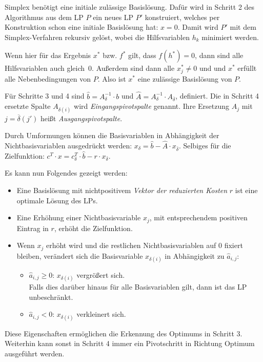 \documentclass{panikzettel}
\begin{document}
Simplex benötigt eine initiale zulässige Basislösung.
Dafür wird in Schritt 2 des Algorithmus aus dem LP $P$ ein neues LP $P'$ konstruiert, welches per Konstruktion schon eine initiale Basislösung hat: $x = 0$.
Damit wird $P'$ mit dem Simplex-Verfahren rekursiv gelöst, wobei die Hilfsvariablen $h_k$ minimiert werden.

Wenn hier für das Ergebnis $x^\ast$ bzw. $f^\ast$ gilt, dass $f(h^\ast) = 0$, dann sind alle Hilfsvariablen auch gleich~$0$.
Außerdem sind dann alle $x^\ast_j \neq 0$ und und $x^\ast$ erfüllt alle Nebenbedingungen von $P$.
Also ist $x^\ast$ eine zulässige Basislösung von $P$.

Für Schritte 3 und 4 sind $\hat{b} = A_{\delta}^{-1} \cdot b$ und $\hat{A} = A_{\delta}^{-1} \cdot A_{\overline{\delta}}$, definiert.
Die in Schritt 4 ersetzte Spalte $A_{\delta(i)}$ wird \emph{Eingangspivotspalte} genannt.
Ihre Ersetzung $A_j$ mit $j = \overline{\delta}(j')$ heißt \emph{Ausgangspivotspalte}.

Durch Umformungen können die Basisvariablen in Abhängigkeit der Nichtbasisvariablen ausgedrückt werden: $x_{\delta} = \hat{b} - \hat{A} \cdot x_{\overline{\delta}}$.
Selbiges für die Zielfunktion: $c^T \cdot x = c_{\delta}^T \cdot \hat{b} - r \cdot x_{\overline{\delta}}$.

Es kann nun Folgendes gezeigt werden:
\begin{itemize}
    \item Eine Basislösung mit nichtpositivem \emph{Vektor der reduzierten Kosten} $r$ ist eine optimale Lösung des LPs.
    \item Eine Erhöhung einer Nichtbasisvariable $x_j$, mit entsprechendem positiven Eintrag in $r$, erhöht die Zielfunktion.
    \item Wenn $x_j$ erhöht wird und die restlichen Nichtbasisvariablen auf $0$ fixiert bleiben, verändert sich die Basisvariable $x_{\delta(i)}$ in Abhängigkeit zu $\hat{a}_{i,j}$:
    \begin{itemize}
        \item $\hat{a}_{i,j} \geq 0$: $x_{\delta(i)}$ vergrößert sich. \\
              Falls dies darüber hinaus für alle Basisvariablen gilt, dann ist das LP unbeschränkt.
        \item $\hat{a}_{i,j} < 0$: $x_{\delta(i)}$ verkleinert sich.
    \end{itemize}
\end{itemize}
\medskip

Diese Eigenschaften ermöglichen die Erkennung des Optimums in Schritt 3.
Weiterhin kann sonst in Schritt 4 immer ein Pivotschritt in Richtung Optimum ausgeführt werden.
\end{document}
